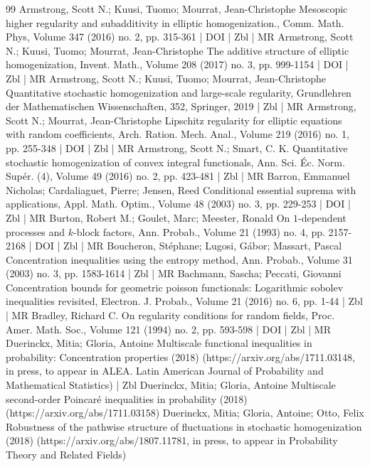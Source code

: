 \documentclass[10pt]{amsart}
\theoremstyle{definition}\newtheorem{defi}[theo]{Definition}\newtheorem{rema}[theo]{Remark}\newtheorem{exam}[theo]{Example}\newtheorem{exem}[theo]{Example}\newtheorem{nota}[theo]{Notation}
\begin{document}
\begin{thebibliography}{99}
Armstrong, Scott N.; Kuusi, Tuomo; Mourrat, Jean-Christophe Mesoscopic higher regularity and subadditivity in elliptic homogenization., Comm. Math. Phys, Volume 347 (2016) no. 2, pp. 315-361 | DOI | Zbl | MR
Armstrong, Scott N.; Kuusi, Tuomo; Mourrat, Jean-Christophe The additive structure of elliptic homogenization, Invent. Math., Volume 208 (2017) no. 3, pp. 999-1154 | DOI | Zbl | MR
Armstrong, Scott N.; Kuusi, Tuomo; Mourrat, Jean-Christophe Quantitative stochastic homogenization and large-scale regularity, Grundlehren der Mathematischen Wissenschaften, 352, Springer, 2019 | Zbl | MR
Armstrong, Scott N.; Mourrat, Jean-Christophe Lipschitz regularity for elliptic equations with random coefficients, Arch. Ration. Mech. Anal., Volume 219 (2016) no. 1, pp. 255-348 | DOI | Zbl | MR
Armstrong, Scott N.; Smart, C. K. Quantitative stochastic homogenization of convex integral functionals, Ann. Sci. Éc. Norm. Supér. (4), Volume 49 (2016) no. 2, pp. 423-481 | Zbl | MR
Barron, Emmanuel Nicholas; Cardaliaguet, Pierre; Jensen, Reed Conditional essential suprema with applications, Appl. Math. Optim., Volume 48 (2003) no. 3, pp. 229-253 | DOI | Zbl | MR
Burton, Robert M.; Goulet, Marc; Meester, Ronald On $1$-dependent processes and $k$-block factors, Ann. Probab., Volume 21 (1993) no. 4, pp. 2157-2168 | DOI | Zbl | MR
Boucheron, Stéphane; Lugosi, Gábor; Massart, Pascal Concentration inequalities using the entropy method, Ann. Probab., Volume 31 (2003) no. 3, pp. 1583-1614 | Zbl | MR
Bachmann, Sascha; Peccati, Giovanni Concentration bounds for geometric poisson functionals: Logarithmic sobolev inequalities revisited, Electron. J. Probab., Volume 21 (2016) no. 6, pp. 1-44 | Zbl | MR
Bradley, Richard C. On regularity conditions for random fields, Proc. Amer. Math. Soc., Volume 121 (1994) no. 2, pp. 593-598 | DOI | Zbl | MR
Duerinckx, Mitia; Gloria, Antoine Multiscale functional inequalities in probability: Concentration properties (2018) (https://arxiv.org/abs/1711.03148, in press, to appear in ALEA. Latin American Journal of Probability and Mathematical Statistics) | Zbl
Duerinckx, Mitia; Gloria, Antoine Multiscale second-order Poincaré inequalities in probability (2018) (https://arxiv.org/abs/1711.03158)
Duerinckx, Mitia; Gloria, Antoine; Otto, Felix Robustness of the pathwise structure of fluctuations in stochastic homogenization (2018) (https://arxiv.org/abs/1807.11781, in press, to appear in Probability Theory and Related Fields)

\end{thebibliography}
\end{document}
